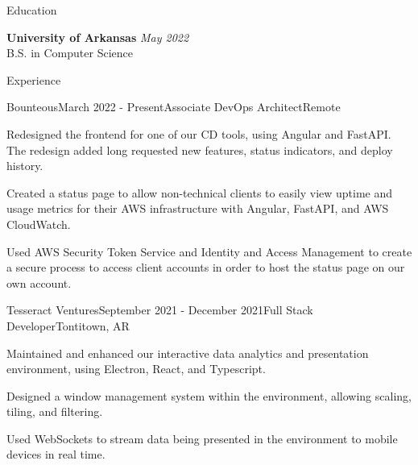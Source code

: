 \documentclass[
	11pt, %
]{resume} %
\begin{document}

\begin{rSection}{Education}
	
	\textbf{University of Arkansas} \hfill \textit{May 2022} \\ 
	B.S. in Computer Science

\end{rSection}


\begin{rSection}{Experience}

	\begin{rSubsection}{Bounteous}{March 2022 - Present}{Associate DevOps Architect}{Remote}
		\item Redesigned the frontend for one of our CD tools, using Angular and FastAPI. The redesign added long requested new features, status indicators, and deploy history.
		\item Created a status page to allow non-technical clients to easily view uptime and usage metrics for their AWS infrastructure with Angular, FastAPI, and AWS CloudWatch.
		\item Used AWS Security Token Service and Identity and Access Management to create a secure process to access client accounts in order to host the status page on our own account.
	\end{rSubsection}


	\begin{rSubsection}{Tesseract Ventures}{September 2021 - December 2021}{Full Stack Developer}{Tontitown, AR}
		\item Maintained and enhanced our interactive data analytics and presentation environment, using Electron, React, and Typescript.
		\item Designed a window management system within the environment, allowing scaling, tiling, and filtering.
		\item Used WebSockets to stream data being presented in the environment to mobile devices in real time.
	\end{rSubsection}


\end{rSection}
\end{document}
